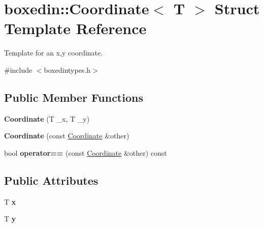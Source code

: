 \hypertarget{structboxedin_1_1Coordinate}{\section{boxedin\+:\+:Coordinate$<$ T $>$ Struct Template Reference}
\label{structboxedin_1_1Coordinate}
}


Template for an x,y coordinate.  




{\ttfamily \#include $<$boxedintypes.\+h$>$}

\subsection*{Public Member Functions}
\begin{DoxyCompactItemize}
\item 
\hypertarget{structboxedin_1_1Coordinate_ad3bdabc16c61f95296220b90b06c15bf}{{\bfseries Coordinate} (T \+\_\+x, T \+\_\+y)}\label{structboxedin_1_1Coordinate_ad3bdabc16c61f95296220b90b06c15bf}

\item 
\hypertarget{structboxedin_1_1Coordinate_a44d72a863840eaa8e071b6468e972c2b}{{\bfseries Coordinate} (const \hyperlink{structboxedin_1_1Coordinate}{Coordinate} \&other)}\label{structboxedin_1_1Coordinate_a44d72a863840eaa8e071b6468e972c2b}

\item 
\hypertarget{structboxedin_1_1Coordinate_aa07e9fbbc10a121870f371c08aed37e6}{bool {\bfseries operator==} (const \hyperlink{structboxedin_1_1Coordinate}{Coordinate} \&other) const }\label{structboxedin_1_1Coordinate_aa07e9fbbc10a121870f371c08aed37e6}

\end{DoxyCompactItemize}
\subsection*{Public Attributes}
\begin{DoxyCompactItemize}
\item 
\hypertarget{structboxedin_1_1Coordinate_a0b6544d31f38d6dd9ec74cee1be7b92d}{T {\bfseries x}}\label{structboxedin_1_1Coordinate_a0b6544d31f38d6dd9ec74cee1be7b92d}

\item 
\hypertarget{structboxedin_1_1Coordinate_a7af501107facf4ff990b9da3d139b67e}{T {\bfseries y}}\label{structboxedin_1_1Coordinate_a7af501107facf4ff990b9da3d139b67e}

\end{DoxyCompactItemize}


